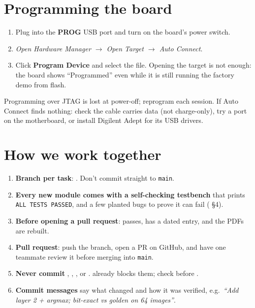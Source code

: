 \documentclass[11pt]{article}
\begin{document}
\section{Programming the board}
\begin{enumerate}
  \item Plug into the \textbf{PROG} USB port and turn on the board's power switch.
  \item \emph{Open Hardware Manager $\rightarrow$ Open Target $\rightarrow$ Auto Connect}.
  \item Click \textbf{Program Device} and select the  file. Opening the
        target is not enough: the board shows ``Programmed'' even while it is still
        running the factory demo from flash.
\end{enumerate}
Programming over JTAG is lost at power-off; reprogram each session. If Auto Connect
finds nothing: check the cable carries data (not charge-only), try a port on the
motherboard, or install Digilent Adept for its USB drivers.

\section{How we work together}
\begin{enumerate}
  \item \textbf{Branch per task}: . Don't commit
        straight to \texttt{main}.
  \item \textbf{Every new module comes with a self-checking testbench} that prints
        \texttt{ALL TESTS PASSED}, and a few planted bugs to prove it can fail
        ( \S4).
  \item \textbf{Before opening a pull request}:  passes,
         has a dated entry, and the PDFs are rebuilt.
  \item \textbf{Pull request}: push the branch, open a PR on GitHub, and have one
        teammate review it before merging into \texttt{main}.
  \item \textbf{Never commit} , , , or
        .  already blocks them; check
         before .
  \item \textbf{Commit messages} say what changed and how it was verified, e.g.\
        \emph{``Add layer 2 + argmax; bit-exact vs golden on 64 images''}.
\end{enumerate}
\end{document}
